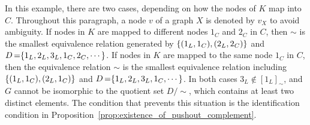   In this example, there are two cases, depending on how the nodes of \(K\) map into \(C\). Throughout this paragraph, a node \(v\) of a graph \(X\) is denoted by \(v_X\) to avoid ambiguity. 
If nodes in $K$ are mapped to different nodes $1_C$ and $2_C$ in $C$, then
        $\sim$ is the smallest equivalence relation generated by $\{(1_L,1_C),(2_L,2_C)\}$ and $D \mathop{=} \{1_L,2_L,3_L,1_C,2_C,\cdots\}$.
If nodes in $K$ are mapped to the same node $1_C$ in $C$, 
then the equivalence relation $\sim$ is the smallest equivalence relation including $\{(1_L,1_C),(2_L,1_C)\}$ and $D \mathop{=} \{1_L,2_L,3_L,1_C,\cdots\}$.
In both cases \(3_L\notin[1_L]_\sim\), and \(G\) cannot be isomorphic to the quotient set \(D/\!\sim\), which contains at least two distinct elements. The condition that prevents this situation is the identification condition in Proposition~\ref{prop:existence_of_pushout_complement}.

